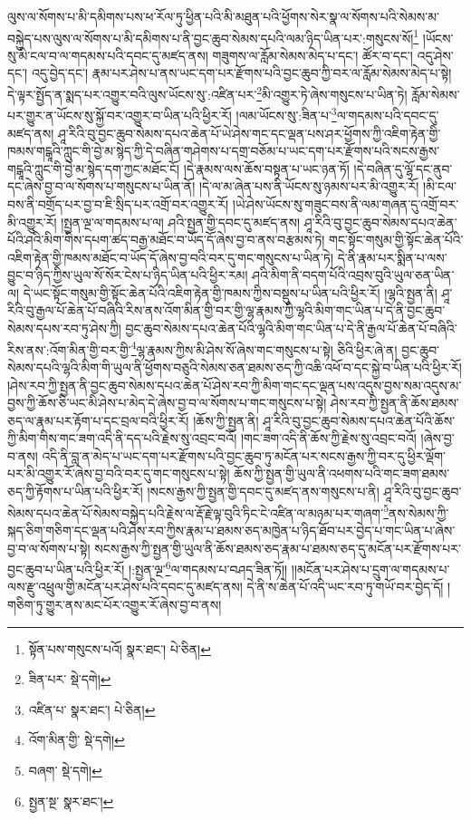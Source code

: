 ལུས་ལ་སོགས་པ་མི་དམིགས་པས་ཕ་རོལ་ཏུ་ཕྱིན་པའི་མི་མཐུན་པའི་ཕྱོགས་སེར་སྣ་ལ་སོགས་པའི་སེམས་མ་བསྐྱེད་པས་ལུས་ལ་སོགས་པ་མི་དམིགས་པ་ནི་བྱང་ཆུབ་སེམས་དཔའི་ལམ་ཉིད་ཡིན་པར་:གསུངས་སོ།\footnote{སྟོན་པས་གསུངས་པའོ།  སྣར་ཐང་།  པེ་ཅིན། } །ཡོངས་སུ་མི་ངལ་བ་ལ་གདམས་པའི་དབང་དུ་མཛད་ནས། གཟུགས་ལ་རློམ་སེམས་མེད་པ་དང་། ཚོར་བ་དང་། འདུ་ཤེས་དང་། འདུ་བྱེད་དང་། རྣམ་པར་ཤེས་པ་ནས་ཡང་དག་པར་རྫོགས་པའི་བྱང་ཆུབ་ཀྱི་བར་ལ་རློམ་སེམས་མེད་པ་སྟེ། དེ་ལྟར་སྤྱོད་ན་སྨད་པར་འགྱུར་བའི་ལུས་ཡོངས་སུ་:འཛིན་པར་\footnote{ཟིན་པར་  སྡེ་དགེ། }མི་འགྱུར་ཏེ་ཞེས་གསུངས་པ་ཡིན་ཏེ། རློམ་སེམས་པར་གྱུར་ན་ཡོངས་སུ་སྐྱོ་བར་འགྱུར་བ་ཡིན་པའི་ཕྱིར་རོ། །ལམ་ཡོངས་སུ་:ཟིན་པ་\footnote{འཛིན་པ་  སྣར་ཐང་།  པེ་ཅིན། }ལ་གདམས་པའི་དབང་དུ་མཛད་ནས། ཤཱ་རིའི་བུ་བྱང་ཆུབ་སེམས་དཔའ་ཆེན་པོ་ཡེ་ཤེས་གང་དང་ལྡན་པས་ཤར་ཕྱོགས་ཀྱི་འཇིག་རྟེན་གྱི་ཁམས་གངྒཱའི་ཀླུང་གི་བྱེ་མ་སྙེད་ཀྱི་དེ་བཞིན་གཤེགས་པ་དགྲ་བཅོམ་པ་ཡང་དག་པར་རྫོགས་པའི་སངས་རྒྱས་གངྒཱའི་ཀླུང་གི་བྱེ་མ་སྙེད་དག་ཀྱང་མཐོང་ངོ། །དེ་རྣམས་ལས་ཆོས་བསྟན་པ་ཡང་ཉན་ཏོ། །དེ་བཞིན་དུ་ལྷོ་དང་ནུབ་དང་ཞེས་བྱ་བ་ལ་སོགས་པ་གསུངས་པ་ཡིན་ནོ། །དེ་ལ་མ་ཞེན་པས་ནི་ཡོངས་སུ་ཉམས་པར་མི་འགྱུར་རོ། །མི་ངལ་བས་ནི་བགྲོད་པར་བྱ་བ་ཇི་སྲིད་པར་འགྲོ་བར་འགྱུར་རོ། །ཡེ་ཤེས་ཡོངས་སུ་གཟུང་བས་ནི་ལམ་གཞན་དུ་འགྲོ་བར་མི་འགྱུར་རོ། །སྤྱན་ལྔ་ལ་གདམས་པ་ལ། ཤའི་སྤྱན་གྱི་དབང་དུ་མཛད་ནས། ཤཱ་རིའི་བུ་བྱང་ཆུབ་སེམས་དཔའ་ཆེན་པོའི་ཤའི་མིག་གིས་དཔག་ཚད་བརྒྱ་མཐོང་བ་ཡོད་དོ་ཞེས་བྱ་བ་ནས་བརྩམས་ཏེ། གང་སྟོང་གསུམ་གྱི་སྟོང་ཆེན་པོའི་འཇིག་རྟེན་གྱི་ཁམས་མཐོང་བ་ཡོད་དོ་ཞེས་བྱ་བའི་བར་དུ་གང་གསུངས་པ་ཡིན་ཏེ། དེ་ནི་རྣམ་པར་སྨིན་པ་ལས་བྱུང་བ་ཉིད་ཀྱིས་ཡུལ་སོ་སོར་ངེས་པ་ཉིད་ཡིན་པའི་ཕྱིར་རམ། ཤའི་མིག་ནི་བདག་པོའི་འབྲས་བུའི་ཡུལ་ཅན་ཡིན་ལ། དེ་ཡང་སྟོང་གསུམ་གྱི་སྟོང་ཆེན་པོའི་འཇིག་རྟེན་གྱི་ཁམས་ཀྱིས་བསྡུས་པ་ཡིན་པའི་ཕྱིར་རོ། །ལྷའི་སྤྱན་ནི། ཤཱ་རིའི་བུ་རྒྱལ་པོ་ཆེན་པོ་བཞིའི་རིས་ནས་འོག་མིན་གྱི་བར་གྱི་ལྷ་རྣམས་ཀྱི་ལྷའི་མིག་གང་ཡིན་པ་དེ་ནི་བྱང་ཆུབ་སེམས་དཔས་རབ་ཏུ་ཤེས་ཀྱི། བྱང་ཆུབ་སེམས་དཔའ་ཆེན་པོའི་ལྷའི་མིག་གང་ཡིན་པ་དེ་ནི་རྒྱལ་པོ་ཆེན་པོ་བཞིའི་རིས་ནས་:འོག་མིན་གྱི་བར་གྱི་\footnote{འོག་མིན་གྱི་  སྡེ་དགེ། }ལྷ་རྣམས་ཀྱིས་མི་ཤེས་སོ་ཞེས་གང་གསུངས་པ་སྟེ། ཅིའི་ཕྱིར་ཞེ་ན། བྱང་ཆུབ་སེམས་དཔའི་ལྷའི་མིག་གི་ཡུལ་ནི་ཕྱོགས་བཅུའི་སེམས་ཅན་ཐམས་ཅད་ཀྱི་འཆི་འཕོ་བ་དང་སྐྱེ་བ་ཡིན་པའི་ཕྱིར་རོ། །ཤེས་རབ་ཀྱི་སྤྱན་ནི་བྱང་ཆུབ་སེམས་དཔའ་ཆེན་པོ་ཤེས་རབ་ཀྱི་མིག་གང་དང་ལྡན་པས་འདུས་བྱས་སམ་འདུས་མ་བྱས་ཀྱི་ཆོས་ཅི་ཡང་མི་ཤེས་པ་མེད་དེ་ཞེས་བྱ་བ་ལ་སོགས་པ་གང་གསུངས་པ་སྟེ། ཤེས་རབ་ཀྱི་སྤྱན་ནི་ཆོས་ཐམས་ཅད་ལ་རྣམ་པར་རྟོག་པ་དང་བྲལ་བའི་ཕྱིར་རོ། །ཆོས་ཀྱི་སྤྱན་ནི། ཤཱ་རིའི་བུ་བྱང་ཆུབ་སེམས་དཔའ་ཆེན་པོའི་ཆོས་ཀྱི་མིག་གིས་གང་ཟག་འདི་ནི་དད་པའི་རྗེས་སུ་འབྲང་བའོ། །གང་ཟག་འདི་ནི་ཆོས་ཀྱི་རྗེས་སུ་འབྲང་བའོ། །ཞེས་བྱ་བ་ནས། འདི་ནི་བླ་ན་མེད་པ་ཡང་དག་པར་རྫོགས་པའི་བྱང་ཆུབ་ཏུ་མངོན་པར་སངས་རྒྱས་ཀྱི་བར་དུ་ཕྱིར་ལྡོག་པར་མི་འགྱུར་རོ་ཞེས་བྱ་བའི་བར་དུ་གང་གསུངས་པ་སྟེ། ཆོས་ཀྱི་སྤྱན་གྱི་ཡུལ་ནི་འཕགས་པའི་གང་ཟག་ཐམས་ཅད་ཀྱི་རྟོགས་པ་ཡིན་པའི་ཕྱིར་རོ། །སངས་རྒྱས་ཀྱི་སྤྱན་གྱི་དབང་དུ་མཛད་ནས་གསུངས་པ་ནི། ཤཱ་རིའི་བུ་བྱང་ཆུབ་སེམས་དཔའ་ཆེན་པོ་སེམས་བསྐྱེད་པའི་རྗེས་ལ་རྡོ་རྗེ་ལྟ་བུའི་ཏིང་ངེ་འཛིན་ལ་མཉམ་པར་གཞག་\footnote{བཞག་  སྡེ་དགེ། }ནས་སེམས་ཀྱི་སྐད་ཅིག་གཅིག་དང་ལྡན་པའི་ཤེས་རབ་ཀྱིས་རྣམ་པ་ཐམས་ཅད་མཁྱེན་པ་ཉིད་ཐོབ་པར་བྱེད་པ་གང་ཡིན་པ་ཞེས་བྱ་བ་ལ་སོགས་པ་སྟེ། སངས་རྒྱས་ཀྱི་སྤྱན་གྱི་ཡུལ་ནི་ཆོས་ཐམས་ཅད་རྣམ་པ་ཐམས་ཅད་དུ་མངོན་པར་རྫོགས་པར་བྱང་ཆུབ་པ་ཡིན་པའི་ཕྱིར་རོ། །:སྤྱན་ལྔ་\footnote{སྤྱན་སྔ་  སྣར་ཐང་། }ལ་གདམས་པ་བཤད་ཟིན་ཏོ།། །།མངོན་པར་ཤེས་པ་དྲུག་ལ་གདམས་པ་ལས་རྫུ་འཕྲུལ་གྱི་མངོན་པར་ཤེས་པའི་དབང་དུ་མཛད་ནས། དེ་ནི་ས་ཆེན་པོ་འདི་ཡང་རབ་ཏུ་གཡོ་བར་བྱེད་དོ། །གཅིག་ཏུ་གྱུར་ནས་མང་པོར་འགྱུར་རོ་ཞེས་བྱ་བ་ནས། 